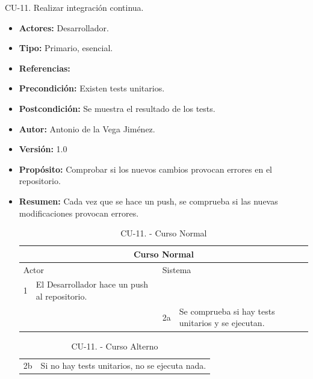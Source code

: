   \item CU-11. Realizar integración continua.
  \begin{itemize}
    \item \textbf{Actores:} Desarrollador.
    \item \textbf{Tipo:} Primario, esencial.
    \item \textbf{Referencias:}
    \item \textbf{Precondición:} Existen tests unitarios.
    \item \textbf{Postcondición:} Se muestra el resultado de los tests.
    \item \textbf{Autor:} Antonio de la Vega Jiménez.
    \item \textbf{Versión:} 1.0
    \item \textbf{Propósito:} Comprobar si los nuevos cambios provocan errores en el repositorio.
    \item \textbf{Resumen:} Cada vez que se hace un \gls{push}, se comprueba si las nuevas modificaciones provocan errores.
    \begin{table}[H]
      \centering
      \begin{tabularx}{\textwidth}{|l|X|l|X|}
        \hline
        \multicolumn{4}{|c|}{\cellcolor[HTML]{C0C0C0}Curso Normal}                                                 \\ \hline
        \multicolumn{2}{|l|}{\cellcolor[HTML]{EFEFEF}Actor} & \multicolumn{2}{l|}{\cellcolor[HTML]{EFEFEF}Sistema} \\ \hline
        1                         & El Desarrollador hace un push al repositorio.                        &                            &                         \\ \hline
                                  &                         & 2a                          & Se comprueba si hay tests unitarios y se ejecutan.                       \\ \hline

                                  
      \end{tabularx}
      \caption{CU-11. - Curso Normal}
      \label{my-label}
    \end{table}
    \begin{table}[H]
      \centering
      \begin{tabularx}{\textwidth}{|l|X|}
       \hline
       \rowcolor[HTML]{C0C0C0} 
       \multicolumn{2}{|l|}{\cellcolor[HTML]{C0C0C0}Curso Alterno} \\ \hline
       \rowcolor[HTML]{FFFFFF} 
              2b                      & Si no hay tests unitarios, no se ejecuta nada.                            \\ \hline
      \end{tabularx}
      \caption{CU-11. - Curso Alterno}
      \label{my-label}
    \end{table}
  \end{itemize}
